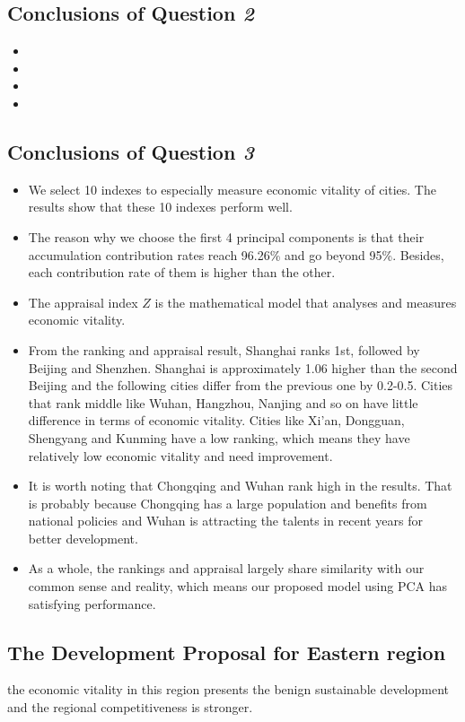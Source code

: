 \documentclass{apmcmthesis}
\begin{document}
\subsection{Conclusions of Question \textit 2}
\begin{itemize}
\item 	
\item
\item
\item
\end{itemize}
\subsection{Conclusions of Question \textit 3}
\begin{itemize}
\item We select 10 indexes to especially measure economic vitality of cities. The results show that these 10 indexes perform well.
\item The reason why we choose the first 4 principal components is that their accumulation contribution rates reach 96.26\% and go beyond 95\%. Besides, each contribution rate of them is higher than the other.
\item The appraisal index $Z$ is the mathematical model that analyses and measures economic vitality.
\item From the ranking and appraisal result, Shanghai ranks 1st, followed by Beijing and Shenzhen. Shanghai is approximately 1.06 higher than the second Beijing and the following cities differ from the previous one by 0.2-0.5. Cities that rank middle like Wuhan, Hangzhou, Nanjing and so on have little difference in terms of economic vitality. Cities like Xi'an, Dongguan, Shengyang and Kunming have a low ranking, which means they have relatively low economic vitality and need improvement.
\item It is worth noting that Chongqing and Wuhan rank high in the results. That is probably because Chongqing has a large population and benefits from national policies and Wuhan is attracting the talents in recent years for better development.
\item As a whole, the rankings and appraisal largely share similarity with our common sense and reality, which means our proposed model using PCA has satisfying performance.
\end{itemize}


\subsection{The Development Proposal for Eastern region}
the economic vitality in this region presents the benign sustainable development and the regional competitiveness is stronger.
\end{document}
